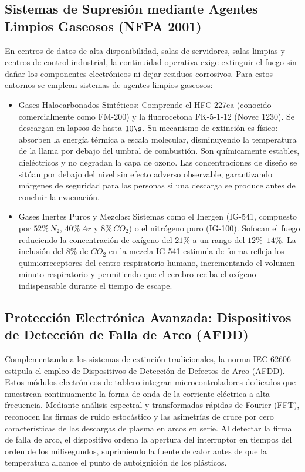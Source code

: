 \subsection{Sistemas de Supresión mediante Agentes Limpios Gaseosos (NFPA 2001)}

En centros de datos de alta disponibilidad, salas de servidores, salas limpias y centros de control industrial, la
continuidad operativa exige extinguir el fuego sin dañar los componentes electrónicos ni dejar residuos corrosivos. Para
estos entornos se emplean sistemas de agentes limpios gaseosos:

\begin{itemize}
    \item Gases Halocarbonados Sintéticos: Comprende el HFC-227ea (conocido comercialmente como FM-200) y la fluorocetona
          FK-5-1-12 (Novec 1230). Se descargan en lapsos de hasta $10\s$. Su mecanismo de extinción es físico: absorben la
          energía térmica a escala molecular, disminuyendo la temperatura de la llama por debajo del umbral de combustión.
          Son químicamente estables, dieléctricos y no degradan la capa de ozono. Las concentraciones de diseño se sitúan
          por debajo del nivel sin efecto adverso observable,
          garantizando márgenes de seguridad para las personas si una descarga se produce antes de concluir la evacuación.
    \item Gases Inertes Puros y Mezclas: Sistemas como el Inergen (IG-541, compuesto por $52\percent\,N_2$, $40\percent\,Ar$
          y $8\percent\,CO_2$) o el nitrógeno puro (IG-100). Sofocan el fuego reduciendo la concentración de oxígeno del
          $21\percent$ a un rango del $12\percent\text{--}14\percent$. La inclusión del $8\percent$ de $CO_2$ en la mezcla
          IG-541 estimula de forma refleja los quimiorreceptores del centro respiratorio humano, incrementando el volumen
          minuto respiratorio y permitiendo que el cerebro reciba el oxígeno indispensable durante el tiempo de escape.
\end{itemize}

\subsection{Protección Electrónica Avanzada: Dispositivos de Detección de Falla de Arco (AFDD)}

Complementando a los sistemas de extinción tradicionales, la norma IEC 62606 estipula el empleo de Dispositivos de
Detección de Defectos de Arco (AFDD). Estos módulos electrónicos de tablero integran microcontroladores dedicados que
muestrean continuamente la forma de onda de la corriente eléctrica a alta frecuencia. Mediante análisis espectral y
transformadas rápidas de Fourier (FFT), reconocen las firmas de ruido estocástico y las asimetrías de cruce por cero
características de las descargas de plasma en arcos en serie. Al detectar la firma de falla de arco, el dispositivo ordena
la apertura del interruptor en tiempos del orden de los milisegundos, suprimiendo la fuente de calor antes de que la
temperatura alcance el punto de autoignición de los plásticos.

